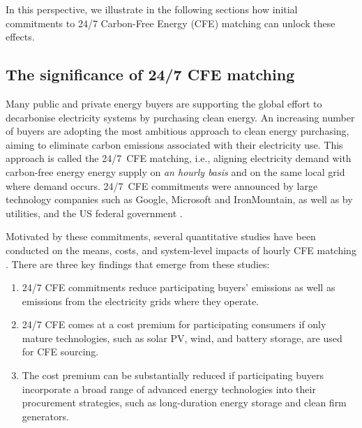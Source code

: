 \documentclass[pdflatex,sn-basic, Numbered]{sn-jnl}
\theoremstyle{thmstyleone}%
\theoremstyle{thmstyletwo}%
\theoremstyle{thmstylethree}%
\begin{document}
In this perspective, we illustrate in the following sections how initial commitments to 24/7 Carbon-Free Energy (CFE) matching can unlock these effects.

\subsection*{The significance of 24/7 CFE matching}\label{sec2}

Many public and private energy buyers are supporting the global effort to decarbonise electricity systems by purchasing clean energy.
An increasing number of buyers are adopting the most ambitious approach to clean energy purchasing, aiming to eliminate carbon emissions associated with their electricity use.
This approach is called the 24/7~CFE matching, i.e., aligning electricity demand with carbon-free energy energy supply on \textit{an hourly basis} and on the same local grid where demand occurs.
24/7~CFE commitments were announced by large technology companies such as Google, Microsoft and IronMountain, as well as by utilities, and the US federal government \cite{gocarbonfree247}.

Motivated by these commitments, several quantitative studies have been conducted on the means, costs, and system-level impacts of hourly CFE matching \cite{xu-247CFE-report, ieaAdvancingDecarbonisationClean2022, riepinMeansCostsSystemlevel2024}. There are three key findings that emerge from these studies:
\begin{enumerate}
    \item 24/7 CFE commitments reduce participating buyers' emissions as well as emissions from the electricity grids where they operate.
    \item 24/7 CFE comes at a cost premium for participating consumers if only mature technologies, such as solar PV, wind, and battery storage, are used for CFE sourcing.
    \item The cost premium can be substantially reduced if participating buyers incorporate a broad range of advanced energy technologies into their procurement strategies, such as long-duration energy storage and clean firm generators.
\end{enumerate}
\end{document}
